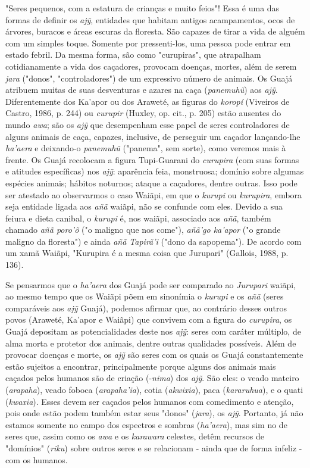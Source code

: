 "Seres pequenos, com a estatura de crianças e muito feios"! Essa é uma
das formas de definir os \emph{ajỹ}, entidades que habitam antigos
acampamentos, ocos de árvores, buracos e áreas escuras da floresta. São
capazes de tirar a vida de alguém com um simples toque. Somente por
pressenti-los, uma pessoa pode entrar em estado febril. Da mesma forma,
são como "curupiras", que atrapalham cotidianamente a vida dos
caçadores, provocam doenças, mortes, além de serem \emph{jara} ("donos",
"controladores") de um expressivo número de animais. Os Guajá atribuem
muitas de suas desventuras e azares na caça (\emph{panemuhũ}) aos
\emph{ajỹ}. Diferentemente dos Ka'apor ou dos Araweté, as figuras do
\emph{koropí} (Viveiros de Castro, 1986, p. 244) ou \emph{curupir}
(Huxley, op. cit., p. 205) estão ausentes do mundo \emph{awa}; são os
\emph{ajỹ} que desempenham esse papel de seres controladores de alguns
animais de caça, capazes, inclusive, de perseguir um caçador
lançando-lhe \emph{ha'aera} e deixando-o \emph{panemuhũ} ("panema", sem
sorte), como veremos mais à frente. Os Guajá recolocam a figura
Tupi-Guarani do \emph{curupira} (com suas formas e atitudes específicas)
nos \emph{ajỹ}: aparência feia, monstruosa; domínio sobre algumas
espécies animais; hábitos noturnos; ataque a caçadores, dentre outras.
Isso pode ser atestado ao observarmos o caso Waiãpi, em que o
\emph{kurupi} ou \emph{kurupira}, embora seja entidade ligada aos
\emph{añã} waiãpi, não se confunde com eles. Devido a sua feiura e dieta
canibal, o \emph{kurupi} é, nos waiãpi, associado aos \emph{añã}, também
chamado \emph{añã poro'õ} ("o maligno que nos come"), \emph{añã'go
ka'apor} ("o grande maligno da floresta") e ainda \emph{añã Tapirã'i}
("dono da sapopema"). De acordo com um xamã Waiãpi, "Kurupira é a mesma
coisa que Jurupari" (Gallois, 1988, p. 136).

Se pensarmos que o \emph{ha'aera} dos Guajá pode ser comparado ao
\emph{Jurupari} waiãpi, ao mesmo tempo que os Waiãpi põem em sinonímia o
\emph{kurupi} e os \emph{añã} (seres comparáveis aos \emph{ajỹ} Guajá),
podemos afirmar que, ao contrário desses outros povos (Araweté, Ka'apor
e Waiãpi) que convivem com a figura do \emph{curupira}, os Guajá
depositam as potencialidades deste nos \emph{ajỹ}: seres com caráter
múltiplo, de alma morta e protetor dos animais, dentre outras qualidades
possíveis. Além de provocar doenças e morte, os \emph{ajỹ} são seres com
os quais os Guajá constantemente estão sujeitos a encontrar,
principalmente porque alguns dos animais mais caçados pelos humanos são
de criação (-\emph{nima}) dos \emph{ajỹ}. São eles: o veado mateiro
(\emph{arapaha}), veado foboca (\emph{arapaha'ia}), cotia
(\emph{akwixia}), paca (\emph{kararuhua}), e o quati (\emph{kwaxia}).
Esses devem ser caçados pelos humanos com comedimento e atenção, pois
onde estão podem também estar seus "donos" (\emph{jara}), os \emph{ajỹ}.
Portanto, já não estamos somente no campo dos espectros e sombras
(\emph{ha'aera}), mas sim no de seres que, assim como os \emph{awa} e os
\emph{karawara} celestes, detêm recursos de "domínios" (\emph{riku})
sobre outros seres e se relacionam - ainda que de forma infeliz - com os
humanos.

